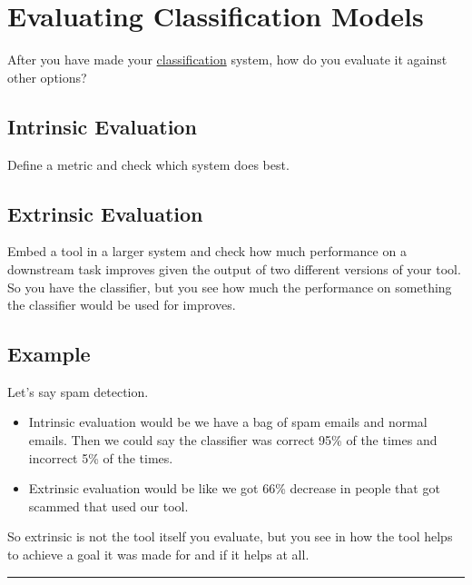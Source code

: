 \documentclass[
  11pt,
  british,
]{article}
\providecommand{\tightlist}{%
  \setlength{\itemsep}{0pt}\setlength{\parskip}{0pt}}
\begin{document}
\hypertarget{evaluating-classification-models}{%
\section{Evaluating Classification
Models}\label{evaluating-classification-models}}

After you have made your \href{../Classification.md}{classification}
system, how do you evaluate it against other options?

\hypertarget{intrinsic-evaluation-2}{%
\subsection{Intrinsic Evaluation}\label{intrinsic-evaluation-2}}

Define a metric and check which system does best.

\hypertarget{extrinsic-evaluation-2}{%
\subsection{Extrinsic Evaluation}\label{extrinsic-evaluation-2}}

Embed a tool in a larger system and check how much performance on a
downstream task improves given the output of two different versions of
your tool. So you have the classifier, but you see how much the
performance on something the classifier would be used for improves.

\hypertarget{example-6}{%
\subsection{Example}\label{example-6}}

Let's say spam detection.

\begin{itemize}
\tightlist
\item
  Intrinsic evaluation would be we have a bag of spam emails and normal
  emails. Then we could say the classifier was correct 95\% of the times
  and incorrect 5\% of the times.
\item
  Extrinsic evaluation would be like we got 66\% decrease in people that
  got scammed that used our tool.
\end{itemize}

So extrinsic is not the tool itself you evaluate, but you see in how the
tool helps to achieve a goal it was made for and if it helps at all.

\begin{center}\rule{0.5\linewidth}{0.5pt}\end{center}
\end{document}
